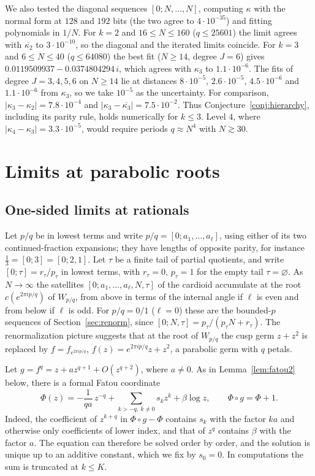 \documentclass[11pt]{amsart}
\theoremstyle{definition}
\theoremstyle{remark}
\newcommand{\fa}[1]{f_{e^{2\pi i#1}}}
\begin{document}
We also tested the diagonal sequences $[0;N,\ldots,N]$, computing $\kappa$ with the normal form at $128$ and $192$ bits (the two agree to $4\cdot10^{-35}$) and fitting polynomials in $1/N$. For $k=2$ and $16\le N\le160$ ($q\le25601$) the limit agrees with $\overline{\kappa_2}$ to $3\cdot10^{-10}$, so the diagonal and the iterated limits coincide. For $k=3$ and $6\le N\le40$ ($q\le64080$) the best fit ($N\ge14$, degree $J=6$) gives $0.0119509937-0.0374804294\,i$, which agrees with $\kappa_3$ to $1.1\cdot10^{-6}$. The fits of degree $J=3,4,5,6$ on $N\ge14$ lie at distances $8\cdot10^{-5}$, $2.6\cdot10^{-5}$, $4.5\cdot10^{-6}$ and $1.1\cdot10^{-6}$ from $\kappa_3$, so we take $10^{-5}$ as the uncertainty. For comparison, $|\kappa_3-\kappa_2|=7.8\cdot10^{-4}$ and $|\kappa_3-\overline{\kappa_3}|=7.5\cdot10^{-2}$. Thus Conjecture~\ref{conj:hierarchy}, including its parity rule, holds numerically for $k\le3$. Level $4$, where $|\kappa_4-\kappa_3|=3.3\cdot10^{-5}$, would require periods $q\approx N^4$ with $N\gtrsim30$.

\section{Limits at parabolic roots}\label{sec:component}

\subsection{One-sided limits at rationals}\label{sec:rational}
Let $p/q$ be in lowest terms and write $p/q=[0;a_1,\ldots,a_\ell]$, using either of its two continued-fraction expansions; they have lengths of opposite parity, for instance $\frac13=[0;3]=[0;2,1]$. Let $\tau$ be a finite tail of partial quotients, and write $[0;\tau]=r_\tau/p_\tau$ in lowest terms, with $r_\tau=0$, $p_\tau=1$ for the empty tail $\tau=\varnothing$. As $N\to\infty$ the satellites $[0;a_1,\ldots,a_\ell,N,\tau]$ of the cardioid accumulate at the root $c(e^{2\pi ip/q})$ of $W_{p/q}$, from above in terms of the internal angle if $\ell$ is even and from below if $\ell$ is odd. For $p/q=0/1$ ($\ell=0$) these are the bounded-$p$ sequences of Section~\ref{sec:renorm}, since $[0;N,\tau]=p_\tau/(p_\tau N+r_\tau)$. The renormalization picture suggests that at the root of $W_{p/q}$ the cusp germ $z+z^2$ is replaced by $f=\fa{p/q}$, $f(z)=e^{2\pi ip/q}z+z^2$, a parabolic germ with $q$ petals.

Let $g=f^q=z+az^{q+1}+O(z^{q+2})$, where $a\ne0$. As in Lemma~\ref{lem:fatou2} below, there is a formal Fatou coordinate
\[
\Phi(z)=-\frac1{qa}\,z^{-q}+\sum_{k>-q,\ k\ne0}s_kz^k+\beta\log z,\qquad\Phi\circ g=\Phi+1 .
\]
Indeed, the coefficient of $z^{k+q}$ in $\Phi\circ g-\Phi$ contains $s_k$ with the factor $ka$ and otherwise only coefficients of lower index, and that of $z^q$ contains $\beta$ with the factor $a$. The equation can therefore be solved order by order, and the solution is unique up to an additive constant, which we fix by $s_0=0$. In computations the sum is truncated at $k\le K$.
\end{document}
